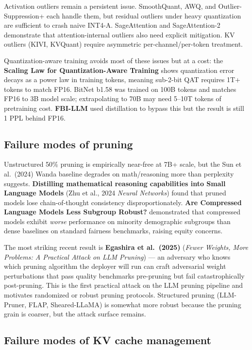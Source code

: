 \documentclass{article}
\begin{document}
Activation outliers remain a persistent issue. SmoothQuant, AWQ, and Outlier-Suppression+ each handle them, but residual outliers under heavy quantization are sufficient to crash naive INT4-A. SageAttention and SageAttention-2 demonstrate that attention-internal outliers also need explicit mitigation. KV outliers (KIVI, KVQuant) require asymmetric per-channel/per-token treatment.

Quantization-aware training avoids most of these issues but at a cost: the \textbf{Scaling Law for Quantization-Aware Training} \citep{chen20252025} shows quantization error decays as a power law in training tokens, meaning sub-2-bit QAT requires 1T+ tokens to match FP16. BitNet b1.58 was trained on 100B tokens and matches FP16 to 3B model scale; extrapolating to 70B may need 5--10T tokens of pretraining cost. \textbf{FBI-LLM} \citep{ma20242024} used distillation to bypass this but the result is still 1 PPL behind FP16.

\subsection{Failure modes of pruning}\label{failure-modes-of-pruning}

Unstructured 50\% pruning is empirically near-free at 7B+ scale, but the Sun et al.~(2024) Wanda baseline degrades on math/reasoning more than perplexity suggests. \textbf{Distilling mathematical reasoning capabilities into Small Language Models} (Zhu et al., 2024 \emph{Neural Networks}) found that pruned models lose chain-of-thought consistency disproportionately. \textbf{Are Compressed Language Models Less Subgroup Robust?} \citep{gee2024arecompressedlangu} demonstrated that compressed models exhibit \emph{worse} performance on minority demographic subgroups than dense baselines on standard fairness benchmarks, raising equity concerns.

The most striking recent result is \textbf{Egashira et al.~(2025)} (\emph{Fewer Weights, More Problems: A Practical Attack on LLM Pruning}) --- an adversary who knows which pruning algorithm the deployer will run can craft adversarial weight perturbations that pass quality benchmarks pre-pruning but fail catastrophically post-pruning. This is the first practical attack on the LLM pruning pipeline and motivates randomized or robust pruning protocols. Structured pruning (LLM-Pruner, FLAP, Sheared-LLaMA) is somewhat more robust because the pruning grain is coarser, but the attack surface remains.

\subsection{Failure modes of KV cache management}\label{failure-modes-of-kv-cache-management}
\end{document}
